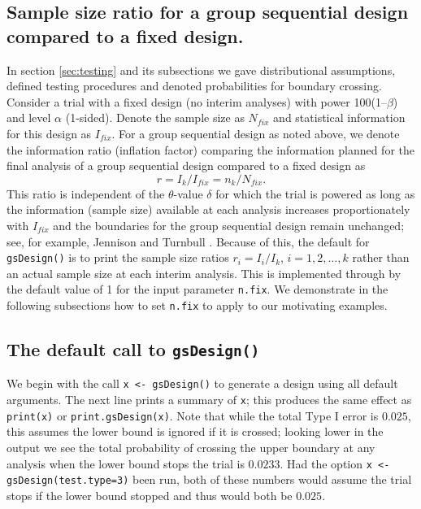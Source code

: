 \subsection{Sample size ratio for a group sequential design compared to a fixed
design.\label{sec:ssratio}}

In section \ref{sec:testing} and its subsections we gave distributional assumptions, defined testing procedures and denoted probabilities for boundary crossing.
Consider a trial with a fixed design (no interim analyses) with power 100(1--$\beta$) and level $\alpha$ (1-sided). Denote the sample size as $N_{fix}$ and statistical information for this design as $I_{fix}$. 
For a group sequential design as noted above, we denote the information ratio (inflation factor) comparing the information planned for the final analysis of a group sequential design compared to a fixed design as
\begin{equation}
r=I_{k}/I_{fix}=n_{k}/N_{fix}.\label{ssratio}%
\end{equation}
This ratio is independent of the $\theta$-value $\delta$ for which the trial
is powered as long as the information (sample size) available at each analysis
increases proportionately with $I_{fix}$ and the boundaries for the group
sequential design remain unchanged; see, for example, Jennison and Turnbull \cite{JTBook}. 
Because of this, the default for \texttt{gsDesign()} is to print the sample size ratios $r_i=I_i/I_k$, $i=1,2,\ldots,k$ rather than an actual sample size at each interim analysis. 
This is implemented through by the default value of 1 for the input parameter \texttt{n.fix}. 
We demonstrate in the following subsections how to set \texttt{n.fix} to apply to our motivating examples.

\subsection{The default call to \texttt{gsDesign()}}
We begin with the call 
\verb!x <- gsDesign()!
to generate a design using all default arguments. The next line
prints a summary of \texttt{x}; this produces the same effect as
\texttt{print(x)} or \texttt{print.gsDesign(x)}. Note that while the total
Type I error is $0.025$, this assumes the lower bound is ignored if it is
crossed; looking lower in the output we see the total probability of crossing
the upper boundary at any analysis when the lower bound stops the trial is
$0.0233$. Had the option 
\verb!x <- gsDesign(test.type=3)!
been run, both of these numbers would assume the trial
stops if the lower bound stopped and thus would both be $0.025$. 

